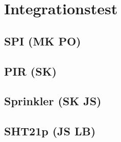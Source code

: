 
\chapter{Integrationstest}

\section{SPI (MK PO)}


\section{PIR (SK)}


\section{Sprinkler (SK JS)}


\section{SHT21p (JS LB)}
